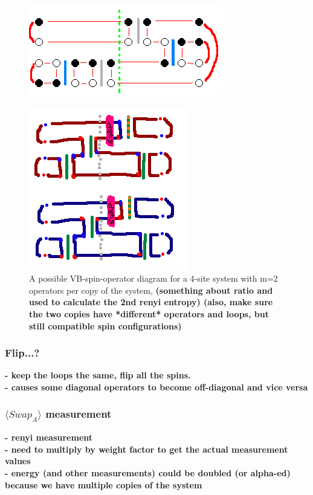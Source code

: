 \documentclass[prb,aps,twocolumn,floatfix,amsmath,amssymb,superscriptaddress,tightenlines]{revtex4}
\begin{document}
\begin{figure} {
\includegraphics[width=2.4 in]{fig_loop_alg.png} \caption{ 
\label{loops} }

} \end{figure}


\begin{figure} {
\includegraphics[width=2.4 in]{oplist.png} \caption{ 
\label{oplist} A possible VB-spin-operator diagram for a 4-site system with m=2 operators per copy of the system, {\bf (something about ratio and used to calculate the 2nd renyi entropy)
(also, make sure the two copies have *different* operators and loops, but still compatible spin configurations)}
}
} \end{figure}



\subsubsection{Flip...?}
\noindent 
{\bf
- keep the loops the same, flip all the spins.\\
- causes some diagonal operators to become off-diagonal and vice versa
}
\subsubsection{$\langle Swap_A \rangle$ measurement}
\noindent
{\bf 
- renyi measurement \\
- need to multiply by weight factor to get the actual measurement values\\
- energy (and other measurements) could be doubled (or alpha-ed) because we have multiple copies of the system
}
\end{document}
